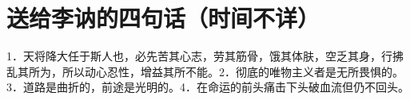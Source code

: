 \section[送给李讷的四句话（时间不详）]{送给李讷的四句话（时间不详）}


1．天将降大任于斯人也，必先苦其心志，劳其筋骨，饿其体肤，空乏其身，行拂乱其所为，所以动心忍性，增益其所不能。2．彻底的唯物主义者是无所畏惧的。3．道路是曲折的，前途是光明的。4．在命运的前头痛击下头破血流但仍不回头。


